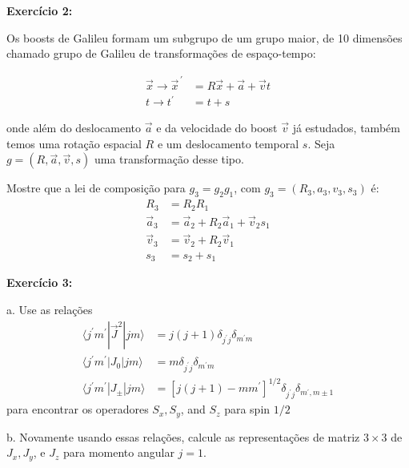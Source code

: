 \documentclass[12pt]{article}
\begin{document}
\textbf{Exercício 2:} 

Os boosts de Galileu formam um subgrupo de um grupo maior,
de 10 dimensões chamado grupo de Galileu de transformações de espaço-tempo:

\[
\begin{aligned}
\vec{x} \rightarrow \vec{x}^{\,\prime}&=R \vec{x}+\vec{a}+\vec{v} t \\ 
t \rightarrow t^{\prime}&=t+s
\end{aligned}
\]

onde além do deslocamento \(\vec{a}\) e da velocidade do boost \(\vec{v}\) já estudados, também temos
uma rotação espacial \(R\) e um deslocamento temporal \(s\). Seja \(g=(R, \vec{a}, \vec{v}, s)\) uma transformação desse tipo.

Mostre que a lei de composição para \(g_{3}=g_{2} g_{1}\), com \(g_{3}=\left(R_{3}, a_{3}, v_{3}, s_{3}\right)\) é:
\[
\begin{aligned} 
R_{3} &=R_{2} R_{1} \\ 
\vec{a}_{3} &=\vec{a}_{2}+R_{2} \vec{a}_{1}+\vec{v}_{2} s_{1} \\ 
\vec{v}_{3} &=\vec{v}_{2}+R_{2} \vec{v}_{1} \\ 
s_{3} &=s_{2}+s_{1} 
\end{aligned}
\]


\textbf{Exercício 3:}

a. Use as relações
\[
\begin{aligned}
\langle j^{\prime} m^{\prime}|\vec{J}^{2}| j m\rangle &=j(j+1) \delta_{j^{\prime} j} \delta_{m^{\prime} m} \\
\langle j^{\prime} m^{\prime}|J_{0}| j m\rangle &=m \delta_{j^{\prime} j} \delta_{m^{\prime} m} \\
\langle j^{\prime} m^{\prime}|J_{\pm}| j m\rangle &=[j(j+1)-m m^{\prime}]^{1 / 2} \delta_{j^{\prime} j} \delta_{m^{\prime}, m \pm 1}
\end{aligned}
\]
para encontrar os operadores $S_{x}, S_{y}$, and $S_{z}$ para spin $1 / 2$

b. Novamente usando essas relações, calcule as representações de matriz $3 \times 3$ 
de $J_{x}, J_{y}$, e $J_{z}$ para momento angular $j=1$.
\end{document}
